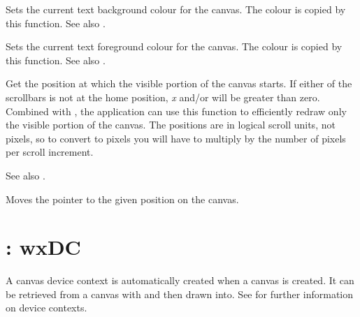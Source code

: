 \label{wxcanvassettextbackground}


Sets the current text background colour for the canvas. The colour is
copied by this function. See also .

\label{wxcanvassettextforeground}


Sets the current text foreground colour for the canvas. The colour is
copied by this function. See also .



Get the position at which the visible portion of the canvas starts. If
either of the scrollbars is not at the home position, {\it x} and/or
 will be greater than zero.  Combined with ,
the application can use this function to efficiently redraw only the
visible portion of the canvas.  The positions are in logical scroll
units, not pixels, so to convert to pixels you will have to multiply
by the number of pixels per scroll increment.

See also .



Moves the pointer to the given position on the canvas.

\section{: wxDC}\label{wxcanvasdc}

A canvas device context is automatically created when a canvas is created.
It can be retrieved from a canvas with  and then
drawn into. See  for further information on device contexts.



